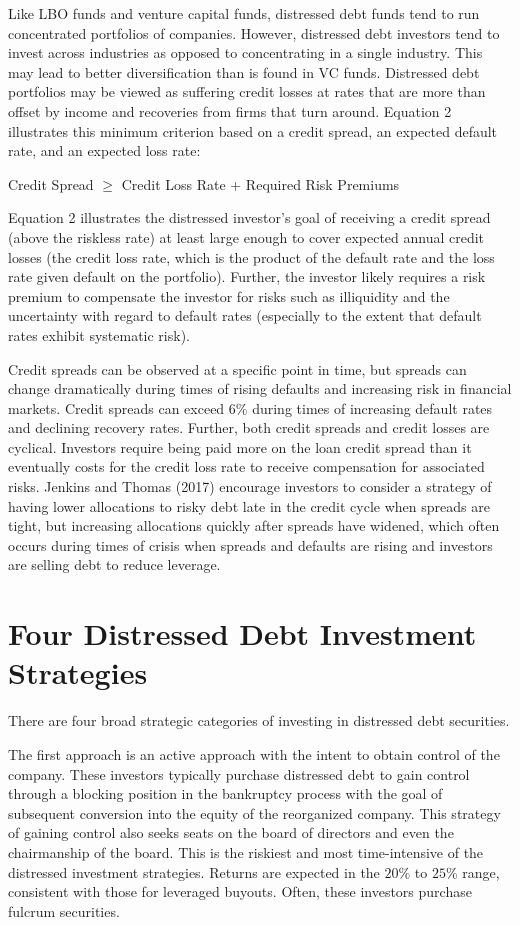 \documentclass[11pt]{article}
\begin{document}
Like LBO funds and venture capital funds, distressed debt funds tend to run concentrated portfolios of companies. However, distressed debt investors tend to invest across industries as opposed to concentrating in a single industry. This may lead to better diversification than is found in VC funds. Distressed debt portfolios may be viewed as suffering credit losses at rates that are more than offset by income and recoveries from firms that turn around. Equation 2 illustrates this minimum criterion based on a credit spread, an expected default rate, and an expected loss rate:

Credit Spread $\geq$ Credit Loss Rate + Required Risk Premiums

Equation 2 illustrates the distressed investor's goal of receiving a credit spread (above the riskless rate) at least large enough to cover expected annual credit losses (the credit loss rate, which is the product of the default rate and the loss rate given default on the portfolio). Further, the investor likely requires a risk premium to compensate the investor for risks such as illiquidity and the uncertainty with regard to default rates (especially to the extent that default rates exhibit systematic risk).

Credit spreads can be observed at a specific point in time, but spreads can change dramatically during times of rising defaults and increasing risk in financial markets. Credit spreads can exceed $6 \%$ during times of increasing default rates and declining recovery rates. Further, both credit spreads and credit losses are cyclical. Investors require being paid more on the loan credit spread than it eventually costs for the credit loss rate to receive compensation for associated risks. Jenkins and Thomas (2017) encourage investors to consider a strategy of having lower allocations to risky debt late in the credit cycle when spreads are tight, but increasing allocations quickly after spreads have widened, which often occurs during times of crisis when spreads and defaults are rising and investors are selling debt to reduce leverage.

\section*{Four Distressed Debt Investment Strategies}
There are four broad strategic categories of investing in distressed debt securities.

The first approach is an active approach with the intent to obtain control of the company. These investors typically purchase distressed debt to gain control through a blocking position in the bankruptcy process with the goal of subsequent conversion into the equity of the reorganized company. This strategy of gaining control also seeks seats on the board of directors and even the chairmanship of the board. This is the riskiest and most time-intensive of the distressed investment strategies. Returns are expected in the $20 \%$ to $25 \%$ range, consistent with those for leveraged buyouts. Often, these investors purchase fulcrum securities.
\end{document}
